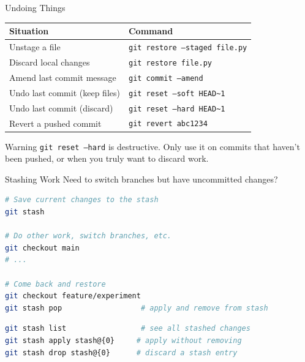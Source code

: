 \documentclass[aspectratio=169, 11pt]{beamer}
\begin{document}
\begin{frame}[fragile]{Undoing Things}
  \begin{table}
    \centering
    \begin{tabular}{@{} l l @{}}
      \toprule
      \textbf{Situation} & \textbf{Command} \\
      \midrule
      Unstage a file                & \texttt{git restore --staged file.py} \\
      Discard local changes         & \texttt{git restore file.py} \\
      Amend last commit message     & \texttt{git commit --amend} \\
      Undo last commit (keep files) & \texttt{git reset --soft HEAD\textasciitilde1} \\
      Undo last commit (discard)    & \texttt{git reset --hard HEAD\textasciitilde1} \\
      Revert a pushed commit        & \texttt{git revert abc1234} \\
      \bottomrule
    \end{tabular}
  \end{table}

  \begin{alertblock}{Warning}
    \texttt{git reset --hard} is destructive. Only use it on commits that haven't been pushed, or when you truly want to discard work.
  \end{alertblock}
\end{frame}

\begin{frame}[fragile]{Stashing Work}
  Need to switch branches but have uncommitted changes?

  \begin{lstlisting}[language=bash]
# Save current changes to the stash
git stash

# Do other work, switch branches, etc.
git checkout main
# ...

# Come back and restore
git checkout feature/experiment
git stash pop                  # apply and remove from stash
  \end{lstlisting}

  \vspace{0.3em}
  \begin{lstlisting}[language=bash]
git stash list                 # see all stashed changes
git stash apply stash@{0}     # apply without removing
git stash drop stash@{0}      # discard a stash entry
  \end{lstlisting}
\end{frame}
\end{document}
